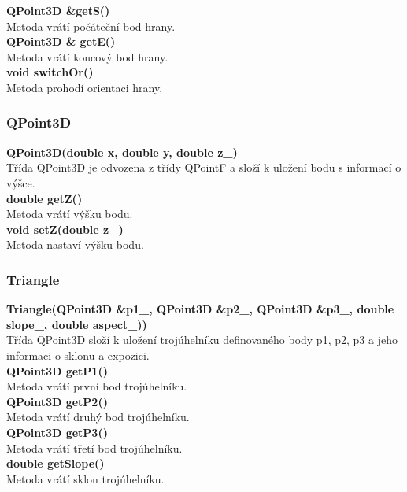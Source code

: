 \documentclass[a4paper, 12pt]{article}
\begin{document}
\textbf{QPoint3D \&getS()}\\
Metoda vrátí počáteční bod hrany.\\

\textbf{QPoint3D \& getE()}\\
Metoda vrátí koncový bod hrany.\\

\textbf{void switchOr()}\\
Metoda prohodí orientaci hrany.\\

\subsubsection{QPoint3D}
\textbf{QPoint3D(double x, double y, double z\_)}\\
Třída QPoint3D je odvozena z třídy QPointF a složí k uložení bodu s informací o výšce.\\

\textbf{double getZ()}\\
Metoda vrátí výšku bodu.\\

\textbf{void setZ(double z\_)}\\
Metoda nastaví výšku bodu.\\

\subsubsection{Triangle}
\textbf{Triangle(QPoint3D \&p1\_, QPoint3D \&p2\_, QPoint3D \&p3\_, double slope\_, double aspect\_))}\\
Třída QPoint3D složí k uložení trojúhelníku definovaného body p1, p2, p3 a jeho informaci o sklonu a expozici.\\

\textbf{ QPoint3D getP1()}\\
Metoda vrátí první bod trojúhelníku.\\

\textbf{ QPoint3D getP2()}\\
Metoda vrátí druhý bod trojúhelníku.\\

\textbf{ QPoint3D getP3()}\\
Metoda vrátí třetí bod trojúhelníku.\\

\textbf{double getSlope()}\\
Metoda vrátí sklon trojúhelníku.\\
\end{document}
